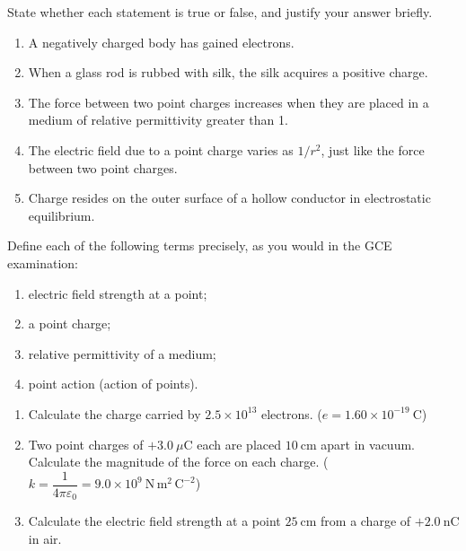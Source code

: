 \documentclass[11pt]{article}
\newcounter{popsec}
\newcounter{popsub}
\newcommand{\courssub}[1]{%
  \stepcounter{popsub}%
  \par\vspace{9pt}\noindent{\popxbold\fontsize{11.5}{13}\selectfont\color{popink}{\color{poporange}\thepopsec.\thepopsub}\hspace{6pt}#1}\par\nopagebreak\vspace{4pt}
}
\begin{document}
\begin{exercice}
State whether each statement is true or false, and justify your answer briefly.
\begin{enumerate}
\item A negatively charged body has gained electrons.
\item When a glass rod is rubbed with silk, the silk acquires a positive charge.
\item The force between two point charges increases when they are placed in a medium of relative permittivity greater than 1.
\item The electric field due to a point charge varies as $1/r^{2}$, just like the force between two point charges.
\item Charge resides on the outer surface of a hollow conductor in electrostatic equilibrium.
\end{enumerate}
\end{exercice}

\begin{exercice}[Definitions]
Define each of the following terms precisely, as you would in the GCE examination:
\begin{enumerate}
\item electric field strength at a point;
\item a point charge;
\item relative permittivity of a medium;
\item point action (action of points).
\end{enumerate}
\end{exercice}

\begin{exercice}
\begin{enumerate}
\item Calculate the charge carried by $2.5\times 10^{13}$ electrons. ($e = 1.60\times 10^{-19}\ \mathrm{C}$)
\item Two point charges of $+3.0\ \mu\mathrm{C}$ each are placed $10\ \mathrm{cm}$ apart in vacuum. Calculate the magnitude of the force on each charge. ($k = \dfrac{1}{4\pi\varepsilon_{0}} = 9.0\times 10^{9}\ \mathrm{N\,m^{2}\,C^{-2}}$)
\item Calculate the electric field strength at a point $25\ \mathrm{cm}$ from a charge of $+2.0\ \mathrm{nC}$ in air.
\end{enumerate}
\end{exercice}

\courssub{I practise}
\end{document}
